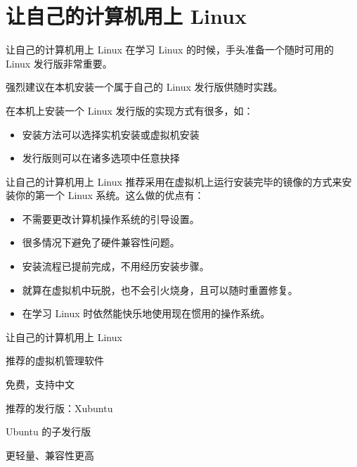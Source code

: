 \documentclass[UTF8]{ctexbeamer}
\begin{document}
\section{让自己的计算机用上 Linux}
\begin{frame}{让自己的计算机用上 Linux}
    在学习 Linux 的时候，手头准备一个随时可用的 Linux 发行版非常重要。

    强烈建议在本机安装一个属于自己的 Linux 发行版供随时实践。

    在本机上安装一个 Linux 发行版的实现方式有很多，如：
    \begin{itemize}
        \item 安装方法可以选择实机安装或虚拟机安装
        \item 发行版则可以在诸多选项中任意抉择
    \end{itemize}
\end{frame}
\begin{frame}{让自己的计算机用上 Linux}
    推荐采用在虚拟机上运行安装完毕的镜像的方式来安装你的第一个 Linux 系统。这么做的优点有：
    \begin{itemize}
        \item 不需要更改计算机操作系统的引导设置。
        \item 很多情况下避免了硬件兼容性问题。
        \item 安装流程已提前完成，不用经历安装步骤。
        \item 就算在虚拟机中玩脱，也不会引火烧身，且可以随时重置修复。
        \item 在学习 Linux 时依然能快乐地使用现在惯用的操作系统。
    \end{itemize}
\end{frame}
\begin{frame}{让自己的计算机用上 Linux}

    推荐的虚拟机管理软件
    
    免费，支持中文

    
    推荐的发行版：Xubuntu
    
    Ubuntu 的子发行版
    
    更轻量、兼容性更高

\end{frame}
\end{document}
